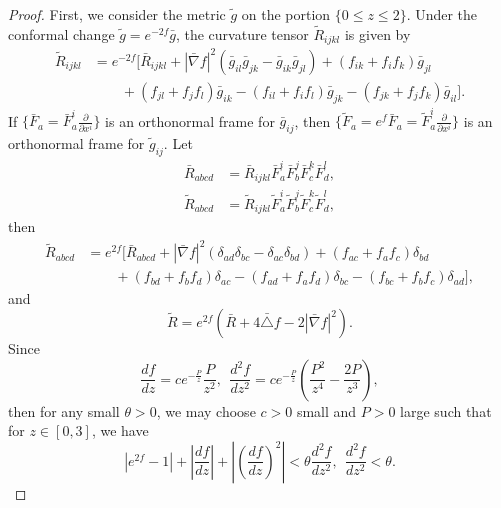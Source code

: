 \begin{proof}
First, we consider the metric $\tilde{g}$ on the portion $\{0 \leq
z \leq 2\}$. Under the conformal change $\tilde{g}=
e^{-2f}\bar{g}$, the curvature tensor $\tilde{R}_{ijkl}$ is given
by
\begin{align*}
\tilde{R}_{ijkl} &= e^{-2f}\Big[\bar{R}_{ijkl} + |\bar{\nabla}
f|^2(\bar{g}_{il}\bar{g}_{jk}-\bar{g}_{ik}\bar{g}_{jl}) + (f_{ik}
+ f_if_k)\bar{g}_{jl} \\
&\qquad + (f_{jl} + f_jf_l)\bar{g}_{ik} - (f_{il} +
f_if_l)\bar{g}_{jk} - (f_{jk} + f_jf_k)\bar{g}_{il}\Big].
\end{align*}
If $\{\bar{F}_a = \bar{F}^i_a\frac{\partial}{\partial x^i}\}$ is
an orthonormal frame for $\bar{g}_{ij}$, then $\{\tilde{F}_a =
e^f\bar{F}_a = \tilde{F}^i_a\frac{\partial}{\partial x^i}\}$ is an
orthonormal frame for $\tilde{g}_{ij}$. Let
\begin{align*}
\bar{R}_{abcd}
&= \bar{R}_{ijkl}\bar{F}^i_a\bar{F}^j_b\bar{F}^k_c\bar{F}^l_d,\\
\tilde{R}_{abcd}
&=\tilde{R}_{ijkl}\tilde{F}^i_a\tilde{F}^j_b\tilde{F}^k_c\tilde{F}^l_d,
\end{align*}
then
\begin{align}
\tilde{R}_{abcd} &= e^{2f}\Big[\bar{R}_{abcd} + |\bar{\nabla}
f|^2(\delta_{ad}\delta_{bc}-\delta_{ac}\delta_{bd}) + (f_{ac} +
f_af_c)\delta_{bd} \\
&\qquad + (f_{bd} + f_bf_d)\delta_{ac} - (f_{ad} +
f_af_d)\delta_{bc} - (f_{bc} + f_bf_c)\delta_{ad}\Big], \nonumber
\end{align}
and \begin{equation} \tilde{R} = e^{2f}(\bar{R} + 4\bar{\triangle} f
-2|\bar{\nabla}f|^2). %
\end{equation} Since
$$
\frac{df}{dz}= ce^{-\frac{P}{z}}\frac{P}{z^2}, \ \
\frac{d^2f}{dz^2} =
ce^{-\frac{P}{z}}\left(\frac{P^2}{z^4}-\frac{2P}{z^3}\right),
$$
then for any small $\theta >0$, we may choose $c>0$ small and
$P>0$ large such that for $z \in [0,3]$, we have \begin{equation} |e^{2f} - 1|
+ \left|\frac{df}{dz}\right| + \left|\left(\frac{df}{dz}\right)^2\right| <
\theta \frac{d^2f}{dz^2}, \ \ \frac{d^2f}{dz^2} < \theta.
\end{equation}


\end{proof}
